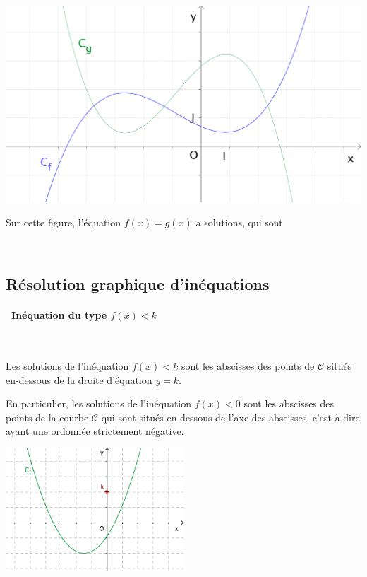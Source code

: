 \begin{minipage}[c]{0.5\linewidth}
  \includegraphics[width=\textwidth]{F_resineq_fg.pdf}
\end{minipage}
\qquad
\begin{minipage}[t]{0.4\linewidth}
  Sur cette figure, l'équation $f(x)=g(x)$ a \hspace{1cm} solutions,
  qui sont
\end{minipage} \\[1em]



\subsection{Résolution graphique d'inéquations}

\paragraph{\textbullet \ Inéquation du type $f(x)<k$} \ \par
Les solutions de l'inéquation $f(x)<k$ sont les abscisses des points
de $\mathscr{C}$ situés en-dessous de la droite d'équation $y=k$.

En particulier, les solutions de l'inéquation $f(x)<0$ sont les
abscisses des points de la courbe $\mathscr{C}$ qui sont situés
en-dessous de l'axe des abscisses, c'est-à-dire ayant une ordonnée
strictement négative.\\

\medskip

{\centering
\includegraphics[width=0.5\textwidth]{F_resineq_f.pdf}
\par}

